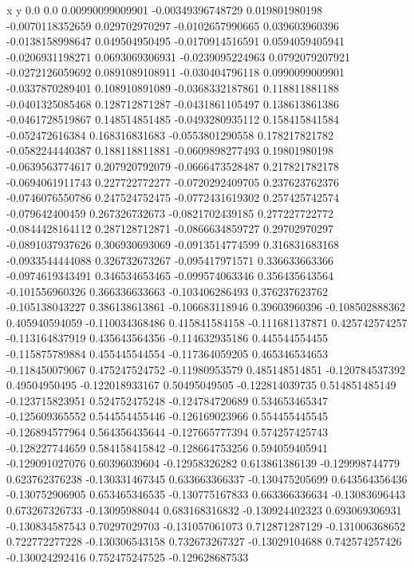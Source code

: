               x                y
            0.0              0.0
0.00990099009901  -0.00349396748729
 0.019801980198  -0.0070118352659
 0.029702970297  -0.0102657990665
 0.039603960396  -0.0138158998647
 0.049504950495  -0.0170914516591
0.0594059405941  -0.0206931198271
0.0693069306931  -0.0239095224963
0.0792079207921  -0.0272126059692
0.0891089108911  -0.030404796118
0.0990099009901  -0.0337870289401
 0.108910891089  -0.0368332187861
 0.118811881188  -0.0401325085468
 0.128712871287  -0.0431861105497
 0.138613861386  -0.0461728519867
 0.148514851485  -0.0493280935112
 0.158415841584  -0.052472616384
 0.168316831683  -0.0553801290558
 0.178217821782  -0.0582244440387
 0.188118811881  -0.0609898277493
  0.19801980198  -0.0639563774617
 0.207920792079  -0.0666473528487
 0.217821782178  -0.0694061911743
 0.227722772277  -0.0720292409705
 0.237623762376  -0.0746076550786
 0.247524752475  -0.0772431619302
 0.257425742574  -0.079642400459
 0.267326732673  -0.0821702439185
 0.277227722772  -0.0844428164112
 0.287128712871  -0.0866634859727
  0.29702970297  -0.0891037937626
 0.306930693069  -0.0913514774599
 0.316831683168  -0.0933544444088
 0.326732673267  -0.095417971571
 0.336633663366  -0.0974619343491
 0.346534653465  -0.099574063346
 0.356435643564  -0.101556960326
 0.366336633663  -0.103406286493
 0.376237623762  -0.105138043227
 0.386138613861  -0.106683118946
  0.39603960396  -0.108502888362
 0.405940594059  -0.110034368486
 0.415841584158  -0.111681137871
 0.425742574257  -0.113164837919
 0.435643564356  -0.114632935186
 0.445544554455  -0.115875789884
 0.455445544554  -0.117364059205
 0.465346534653  -0.118450079067
 0.475247524752   -0.11980953579
 0.485148514851  -0.120784537392
  0.49504950495  -0.122018933167
  0.50495049505  -0.122814039735
 0.514851485149  -0.123715823951
 0.524752475248  -0.124784720689
 0.534653465347  -0.125609365552
 0.544554455446  -0.126169023966
 0.554455445545  -0.126894577964
 0.564356435644  -0.127665777394
 0.574257425743  -0.128227744659
 0.584158415842  -0.128664753256
 0.594059405941  -0.129091027076
  0.60396039604   -0.12958326282
 0.613861386139  -0.129998744779
 0.623762376238  -0.130331467345
 0.633663366337  -0.130475205699
 0.643564356436  -0.130752906905
 0.653465346535  -0.130775167833
 0.663366336634   -0.13083696443
 0.673267326733   -0.13095988044
 0.683168316832  -0.130924402323
 0.693069306931  -0.130834587543
  0.70297029703  -0.131057061073
 0.712871287129  -0.131006368652
 0.722772277228  -0.130306543158
 0.732673267327   -0.13029104688
 0.742574257426  -0.130024292416
 0.752475247525  -0.129628687533

